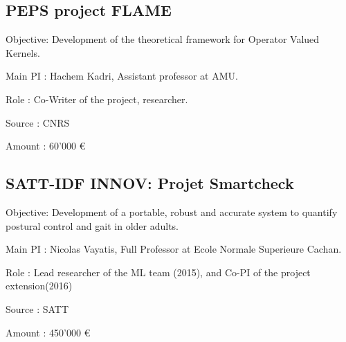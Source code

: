 \documentclass[letter,10pt]{article}
\begin{document}
\subsection{PEPS project FLAME}
\begin{zitemize}
\item Objective: Development of the theoretical framework for Operator Valued Kernels.
\item Main PI : Hachem Kadri, Assistant professor at AMU.
\item Role : Co-Writer of the project, researcher.
\item Source : CNRS
\item Amount : 60'000 \euro
\end{zitemize}

\subsection{SATT-IDF INNOV: Projet Smartcheck}
\begin{zitemize}
\item Objective: Development of a portable, robust and accurate system to quantify postural control and gait in older adults.
\item Main PI : Nicolas Vayatis, Full Professor at Ecole Normale Superieure Cachan.
\item Role : Lead researcher of the ML team (2015), and Co-PI of the project extension(2016)
\item Source : SATT
\item Amount : 450'000 \euro
\end{zitemize}
\end{document}
